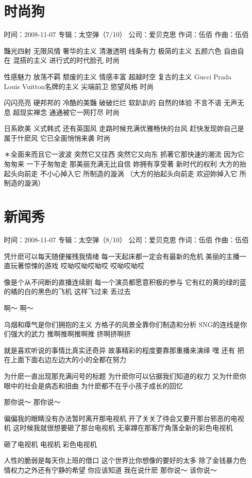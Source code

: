 \documentclass[UTF8,a4paper,oneside,twocolumn,12pt]{ctexbook}
\newcommand{\infopair}[2]{\textbullet #1：#2}
\newcommand{\zc}[1][伍佰]{\infopair{作词}{#1}}
\newcommand{\zq}[1][伍佰]{\infopair{作曲}{#1}}
\newcommand{\zj}[1]{\infopair{专辑}{#1}}
\newcommand{\sj}[1]{\infopair{时间}{#1}}
\newcommand{\gs}[1]{\infopair{公司}{#1}}
\newenvironment{info}{\begin{flushleft}\kaishu
	}
	{\end{flushleft}\normalsize\yahei\par}
\newenvironment{lyric}{
	}
{}
\begin{document}
\section{时尚狗}
\begin{info}
	\sj{2008-11-07}
	\zj{太空弹（7/10）}
	\gs{爱贝克思}
	\zc
	\zq
\end{info}
\begin{lyric}
	豔光四射 无限风情 奢华的主义
	清澈透明 线条有力 极简的主义
	五颜六色 自由自在 混搭的主义
	进行式的时代脸孔 时尚

	性感魅力 放荡不羁 颓废的主义
	情感丰富 超越时空 复古的主义
	Gucci Prada Louis Vuitton名牌的主义
	尖端前卫 慾望风格 时尚

	闪闪亮亮 硬邦邦的 冷酷的美豔
	破破烂烂 软趴趴的 自然的体验
	不言不语 无声无息 超现实禅念
	通通被它一网打尽 时尚

	日系欧美 义式韩式 还有英国风
	走路时候充满优雅畅快的台风
	赶快发现妳自己是属于什麽风
	它已全面悄悄来袭 时尚

	＊全面来而且它一波波 突然它又往西 突然它又向东
	抓著它那快速的潮流 因为它匆匆来 一下子匆匆走
	那美丽充满无比自信 妳拥有享受著 新时代的权利
	大方的抬起头向前走 不小心掉入它 所制造的漩涡
	（大方的抬起头向前走 欢迎妳掉入它 所制造的漩涡）
\end{lyric}

\section{新闻秀}
\begin{info}
	\sj{2008-11-07}
	\zj{太空弹（8/10）}
	\gs{爱贝克思}
	\zc
	\zq
\end{info}
\begin{lyric}
	凭什麽可以每天随便摧残我情绪
	每一天起床都一定会有最新的危机
	美丽的主播一直玩著惊悚的游戏
	哎呦哎呦哎呦哎 哎呦哎呦哎

	像是个从不间断的直播连续剧
	每一个演员都愿意积极的参与
	它有红的黄的绿的蓝的橘的白的黑色的飞机
	这样飞过来 丢过去

	啊～
	啊～

	乌烟和瘴气是你们拥抱的主义
	方格子的风景全靠你们制造和分析
	SNG的连线是你们强大的武力
	推啊推啊推啊推 挤啊挤啊挤

	就是喜欢听说的事情比真实还奇异
	故事精彩的程度要靠那重播来演绎
	嘿 还有
	把在上面下面右边左边大的小的全都在努力

	为什麽一直出现那充满问号的标题
	为什麽你可以佔据我们知道的权力
	又为什麽你眼中的社会是病态和扭曲
	为什麽都不在乎小孩子成长的回忆

	那你说～ 那你说～

	偏偏我的眼睛没有办法暂时离开那电视机
	开了关关了待会又要开那台邪恶的电视机
	这时候我就很想要砸了那台电视机
	无辜蹲在那客厅角落全新的彩色电视机

	砸了电视机 电视机 彩色电视机

	人性的脆弱是每天你上班的借口
	这个世界比你想像的要好的太多
	除了金钱暴力色情权力之外还有宁静的希望
	你应该知道 我在说什麽
	那你说～ 该你说～
\end{lyric}
\end{document}
